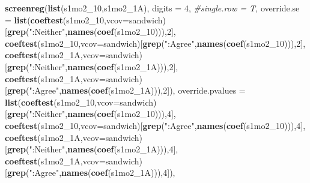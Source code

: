 \documentclass[
]{article}
\newenvironment{Shaded}{\begin{snugshade}}{\end{snugshade}}
\newcommand{\CommentTok}[1]{\textcolor[rgb]{0.56,0.35,0.01}{\textit{#1}}}
\newcommand{\DataTypeTok}[1]{\textcolor[rgb]{0.13,0.29,0.53}{#1}}
\newcommand{\DecValTok}[1]{\textcolor[rgb]{0.00,0.00,0.81}{#1}}
\newcommand{\KeywordTok}[1]{\textcolor[rgb]{0.13,0.29,0.53}{\textbf{#1}}}
\newcommand{\NormalTok}[1]{#1}
\newcommand{\StringTok}[1]{\textcolor[rgb]{0.31,0.60,0.02}{#1}}
\begin{document}
\begin{Shaded}
\begin{Highlighting}[]
\KeywordTok{screenreg}\NormalTok{(}\KeywordTok{list}\NormalTok{(s1mo2_}\DecValTok{10}\NormalTok{,s1mo2_1A), }\DataTypeTok{digits =} \DecValTok{4}\NormalTok{, }\CommentTok{#single.row = T,}
          \DataTypeTok{override.se =} \KeywordTok{list}\NormalTok{(}\KeywordTok{coeftest}\NormalTok{(s1mo2_}\DecValTok{10}\NormalTok{,}\DataTypeTok{vcov=}\NormalTok{sandwich)[}\KeywordTok{grep}\NormalTok{(}\StringTok{":Neither"}\NormalTok{,}\KeywordTok{names}\NormalTok{(}\KeywordTok{coef}\NormalTok{(s1mo2_}\DecValTok{10}\NormalTok{))),}\DecValTok{2}\NormalTok{],}
                             \KeywordTok{coeftest}\NormalTok{(s1mo2_}\DecValTok{10}\NormalTok{,}\DataTypeTok{vcov=}\NormalTok{sandwich)[}\KeywordTok{grep}\NormalTok{(}\StringTok{":Agree"}\NormalTok{,}\KeywordTok{names}\NormalTok{(}\KeywordTok{coef}\NormalTok{(s1mo2_}\DecValTok{10}\NormalTok{))),}\DecValTok{2}\NormalTok{],}
                             \KeywordTok{coeftest}\NormalTok{(s1mo2_1A,}\DataTypeTok{vcov=}\NormalTok{sandwich)[}\KeywordTok{grep}\NormalTok{(}\StringTok{":Neither"}\NormalTok{,}\KeywordTok{names}\NormalTok{(}\KeywordTok{coef}\NormalTok{(s1mo2_1A))),}\DecValTok{2}\NormalTok{],}
                             \KeywordTok{coeftest}\NormalTok{(s1mo2_1A,}\DataTypeTok{vcov=}\NormalTok{sandwich)[}\KeywordTok{grep}\NormalTok{(}\StringTok{":Agree"}\NormalTok{,}\KeywordTok{names}\NormalTok{(}\KeywordTok{coef}\NormalTok{(s1mo2_1A))),}\DecValTok{2}\NormalTok{]),}
          \DataTypeTok{override.pvalues =} \KeywordTok{list}\NormalTok{(}\KeywordTok{coeftest}\NormalTok{(s1mo2_}\DecValTok{10}\NormalTok{,}\DataTypeTok{vcov=}\NormalTok{sandwich)[}\KeywordTok{grep}\NormalTok{(}\StringTok{":Neither"}\NormalTok{,}\KeywordTok{names}\NormalTok{(}\KeywordTok{coef}\NormalTok{(s1mo2_}\DecValTok{10}\NormalTok{))),}\DecValTok{4}\NormalTok{],}
                                  \KeywordTok{coeftest}\NormalTok{(s1mo2_}\DecValTok{10}\NormalTok{,}\DataTypeTok{vcov=}\NormalTok{sandwich)[}\KeywordTok{grep}\NormalTok{(}\StringTok{":Agree"}\NormalTok{,}\KeywordTok{names}\NormalTok{(}\KeywordTok{coef}\NormalTok{(s1mo2_}\DecValTok{10}\NormalTok{))),}\DecValTok{4}\NormalTok{],}
                                  \KeywordTok{coeftest}\NormalTok{(s1mo2_1A,}\DataTypeTok{vcov=}\NormalTok{sandwich)[}\KeywordTok{grep}\NormalTok{(}\StringTok{":Neither"}\NormalTok{,}\KeywordTok{names}\NormalTok{(}\KeywordTok{coef}\NormalTok{(s1mo2_1A))),}\DecValTok{4}\NormalTok{],}
                                  \KeywordTok{coeftest}\NormalTok{(s1mo2_1A,}\DataTypeTok{vcov=}\NormalTok{sandwich)[}\KeywordTok{grep}\NormalTok{(}\StringTok{":Agree"}\NormalTok{,}\KeywordTok{names}\NormalTok{(}\KeywordTok{coef}\NormalTok{(s1mo2_1A))),}\DecValTok{4}\NormalTok{]),}

\end{Highlighting}
\end{Shaded}
\end{document}
